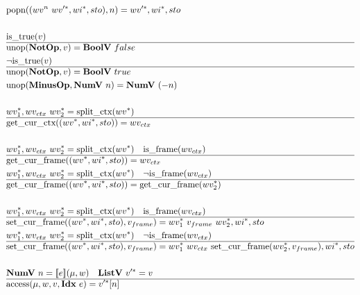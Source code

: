\begin{align*}
  &\popn((wv^n ~ \seq{wv'}, \seq{wi}, sto), n) = \seq{wv'}, \seq{wi}, sto \\
%
\newline \\
  &\istrue(v) \\
  \hline
  &\unop(\notop, v) = \boolv ~ false \\
  &\neg\istrue(v) \\
  \hline
  &\unop(\notop, v) = \boolv ~ true \\
  &\unop(\minusop, \numv ~ n) = \numv ~ (-n) \\
%
\newline \\
  &\seq{wv_1}, wv_{ctx} ~ \seq{wv_2} = \splitctx(\seq{wv}) \\
  \hline
  &\getcurctx((\seq{wv}, \seq{wi}, sto)) = wv_{ctx} \\
%
\newline \\
  &\seq{wv_1}, wv_{ctx} ~ \seq{wv_2} = \splitctx(\seq{wv}) \quad \isframe(wv_{ctx}) \\
  \hline
  &\getcurframe((\seq{wv}, \seq{wi}, sto)) = wv_{ctx} \\
  &\seq{wv_1}, wv_{ctx} ~ \seq{wv_2} = \splitctx(\seq{wv}) \quad \neg \isframe(wv_{ctx}) \\
  \hline
  &\getcurframe((\seq{wv}, \seq{wi}, sto)) = \getcurframe(\seq{wv_2}) \\
%
\newline \\
  &\seq{wv_1}, wv_{ctx} ~ \seq{wv_2} = \splitctx(\seq{wv}) \quad \isframe(wv_{ctx}) \\
  \hline
  &\setcurframe((\seq{wv}, \seq{wi}, sto), v_{frame})
  =
  \seq{wv_1} ~ v_{frame} ~ \seq{wv_2}, \seq{wi}, sto \\
  &\seq{wv_1}, wv_{ctx} ~ \seq{wv_2} = \splitctx(\seq{wv}) \quad \neg \isframe(wv_{ctx}) \\
  \hline
  &\setcurframe((\seq{wv}, \seq{wi}, sto), v_{frame})
  =
  \seq{wv_1} ~ wv_{ctx} ~ \setcurframe(\seq{wv_2}, v_{frame}), \seq{wi}, sto \\
%
\newline \\
  &\numv ~ n = \sem{e}(\mu, w) \quad \listv ~ \seq{v'} = v \\
  \hline
  &\access(\mu, w, v, \idxp ~ e) = \seq{v'}[n] \\

\end{align*}
